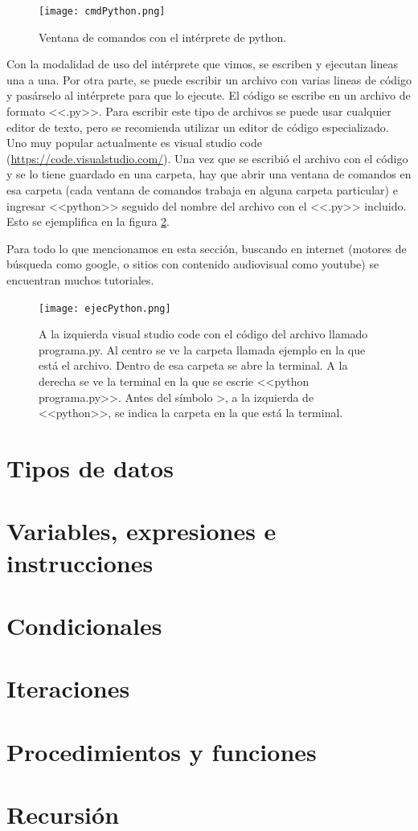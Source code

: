 \documentclass[a4paper, 12pt]{report}
\begin{document}
\begin{figure}
	\centering
	\texttt{[image: cmdPython.png]}
	\caption{Ventana de comandos con el intérprete de python.}
	\label{fig-cmdPython}
\end{figure}

Con la modalidad de uso del intérprete que vimos, se escriben y ejecutan lineas una a una. Por otra parte, se puede escribir un archivo con varias lineas de código y pasárselo al intérprete para que lo ejecute. El código se escribe en un archivo de formato <<.py>>. Para escribir este tipo de archivos se puede usar cualquier editor de texto, pero se recomienda utilizar un editor de código especializado. Uno muy popular actualmente es visual studio code (\href{https://code.visualstudio.com/}{https://code.visualstudio.com/}). Una vez que se escribió el archivo con el código y se lo tiene guardado en una carpeta, hay que abrir una ventana de comandos en esa carpeta (cada ventana de comandos trabaja en alguna carpeta particular) e ingresar <<python>> seguido del nombre del archivo con el <<.py>> incluido. Esto se ejemplifica en la figura \ref{fig-ejecPython}.

Para todo lo que mencionamos en esta sección, buscando en internet (motores de búsqueda como google, o sitios con contenido audiovisual como youtube) se encuentran muchos tutoriales. 

\begin{figure}
	\centering
	\texttt{[image: ejecPython.png]}
	\caption{A la izquierda visual studio code con el código del archivo llamado programa.py. Al centro se ve la carpeta llamada ejemplo en la que está el archivo. Dentro de esa carpeta se abre la terminal. A la derecha se ve la terminal en la que se escrie <<python programa.py>>. Antes del símbolo >, a la izquierda de <<python>>, se indica la carpeta en la que está la terminal.}
	\label{fig-ejecPython}
\end{figure}
\section{Tipos de datos}

\section{Variables, expresiones e instrucciones}

\section{Condicionales}

\section{Iteraciones}

\section{Procedimientos y funciones}

\section{Recursión}
\end{document}
